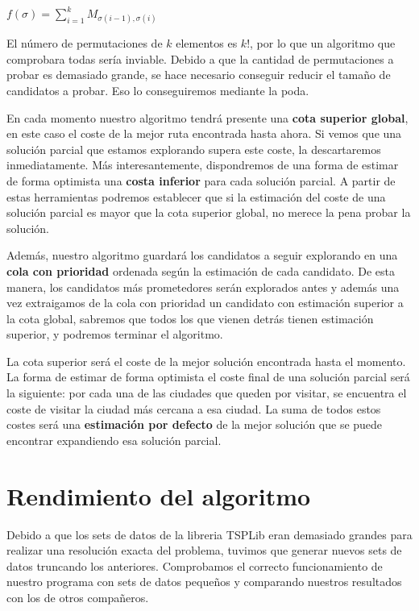 \documentclass[a4paper, 11pt]{article}
\begin{document}
$f(\sigma) = \sum\limits_{i=1}^{k} M_{\sigma(i - 1), \sigma(i)}$

El número de permutaciones de $k$ elementos es $k!$, por lo que un algoritmo que comprobara todas sería inviable. Debido a que la cantidad de permutaciones a probar es demasiado grande, se hace necesario conseguir reducir el tamaño de candidatos a probar. Eso lo conseguiremos mediante la poda.

En cada momento nuestro algoritmo tendrá presente una \textbf{cota superior global}, en este caso el coste de la mejor ruta encontrada hasta ahora. Si vemos que una solución parcial que estamos explorando supera este coste, la descartaremos inmediatamente. Más interesantemente, dispondremos de una forma de estimar de forma optimista una \textbf{costa inferior} para cada solución parcial. A partir de estas herramientas podremos establecer que si la estimación del coste de una solución parcial es mayor que la cota superior global, no merece la pena probar la solución.

Además, nuestro algoritmo guardará los candidatos a seguir explorando en una \textbf{cola con prioridad} ordenada según la estimación de cada candidato. De esta manera, los candidatos más prometedores serán explorados antes y además una vez extraigamos de la cola con prioridad un candidato con estimación superior a la cota global, sabremos que todos los que vienen detrás tienen estimación superior, y podremos terminar el algoritmo.

La cota superior será el coste de la mejor solución encontrada hasta el momento. La forma de estimar de forma optimista el coste final de una solución parcial será la siguiente: por cada una de las ciudades que queden por visitar, se encuentra el coste de visitar la ciudad más cercana a esa ciudad. La suma de todos estos costes será una \textbf{estimación por defecto} de la mejor solución que se puede encontrar expandiendo esa solución parcial.


\section{Rendimiento del algoritmo}
Debido a que los sets de datos de la libreria TSPLib eran demasiado grandes para realizar una resolución exacta del problema, tuvimos que generar nuevos sets de datos truncando los anteriores. Comprobamos el correcto funcionamiento de nuestro programa con sets de datos pequeños y comparando nuestros resultados con los de otros compañeros. 
\end{document}
